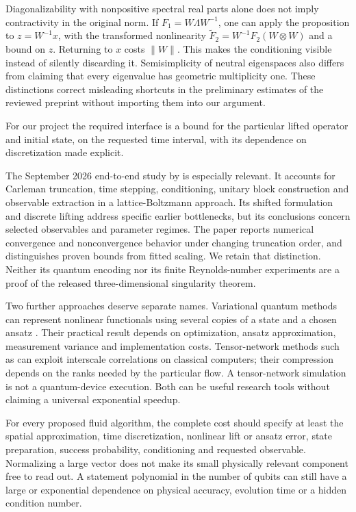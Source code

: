 Diagonalizability with nonpositive spectral real parts alone does not imply contractivity in the original norm. If $F_1=W\Lambda W^{-1}$, one can apply the proposition to $z=W^{-1}x$, with the transformed nonlinearity $\widetilde F_2=W^{-1}F_2(W\otimes W)$ and a bound on $z$. Returning to $x$ costs $\|W\|$. This makes the conditioning visible instead of silently discarding it. Semisimplicity of neutral eigenspaces also differs from claiming that every eigenvalue has geometric multiplicity one. These distinctions correct misleading shortcuts in the preliminary estimates of the reviewed preprint without importing them into our argument.

For our project the required interface is a bound for the particular lifted operator and initial state, on the requested time interval, with its dependence on discretization made explicit.

The September 2026 end-to-end study by \citet{NSJennings2026} is especially relevant. It accounts for Carleman truncation, time stepping, conditioning, unitary block construction and observable extraction in a lattice-Boltzmann approach. Its shifted formulation and discrete lifting address specific earlier bottlenecks, but its conclusions concern selected observables and parameter regimes. The paper reports numerical convergence and nonconvergence behavior under changing truncation order, and distinguishes proven bounds from fitted scaling. We retain that distinction. Neither its quantum encoding nor its finite Reynolds-number experiments are a proof of the released three-dimensional singularity theorem.

Two further approaches deserve separate names. Variational quantum methods can represent nonlinear functionals using several copies of a state and a chosen ansatz \cite{NSLubasch2020}. Their practical result depends on optimization, ansatz approximation, measurement variance and implementation costs. Tensor-network methods such as \citet{NSGourianov2022} can exploit interscale correlations on classical computers; their compression depends on the ranks needed by the particular flow. A tensor-network simulation is not a quantum-device execution. Both can be useful research tools without claiming a universal exponential speedup.

For every proposed fluid algorithm, the complete cost should specify at least the spatial approximation, time discretization, nonlinear lift or ansatz error, state preparation, success probability, conditioning and requested observable. Normalizing a large vector does not make its small physically relevant component free to read out. A statement polynomial in the number of qubits can still have a large or exponential dependence on physical accuracy, evolution time or a hidden condition number.


